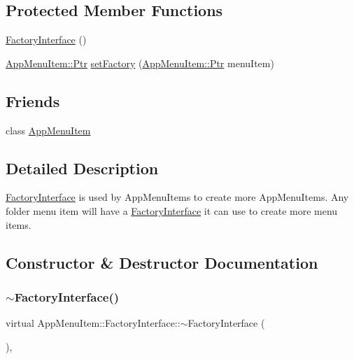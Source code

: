 \subsection*{Protected Member Functions}
\begin{DoxyCompactItemize}
\item 
\mbox{\hyperlink{classAppMenuItem_1_1FactoryInterface_ab8109726ea9a5f74b71b7bc84923b287}{Factory\+Interface}} ()
\item 
\mbox{\hyperlink{classAppMenuItem_ab5f51c5d74f8df62b8862c0cc8126cb7}{App\+Menu\+Item\+::\+Ptr}} \mbox{\hyperlink{classAppMenuItem_1_1FactoryInterface_a6d222242bf0a7cbb28f150c41d92fd7a}{set\+Factory}} (\mbox{\hyperlink{classAppMenuItem_ab5f51c5d74f8df62b8862c0cc8126cb7}{App\+Menu\+Item\+::\+Ptr}} menu\+Item)
\end{DoxyCompactItemize}
\subsection*{Friends}
\begin{DoxyCompactItemize}
\item 
class \mbox{\hyperlink{classAppMenuItem_1_1FactoryInterface_a233b0ef6cd217f2565958dde9ae00802}{App\+Menu\+Item}}
\end{DoxyCompactItemize}


\subsection{Detailed Description}
\mbox{\hyperlink{classAppMenuItem_1_1FactoryInterface}{Factory\+Interface}} is used by App\+Menu\+Items to create more App\+Menu\+Items. Any folder menu item will have a \mbox{\hyperlink{classAppMenuItem_1_1FactoryInterface}{Factory\+Interface}} it can use to create more menu items. 

\subsection{Constructor \& Destructor Documentation}
\mbox{\label{classAppMenuItem_1_1FactoryInterface_af5cf9997d839e15114098f1a0e2a7f56}} 
\subsubsection{\texorpdfstring{$\sim$\+Factory\+Interface()}{~FactoryInterface()}}
{\footnotesize\ttfamily virtual App\+Menu\+Item\+::\+Factory\+Interface\+::$\sim$\+Factory\+Interface (\begin{DoxyParamCaption}{ }\end{DoxyParamCaption})\hspace{0.3cm}{\ttfamily [inline]}, {\ttfamily [virtual]}}

